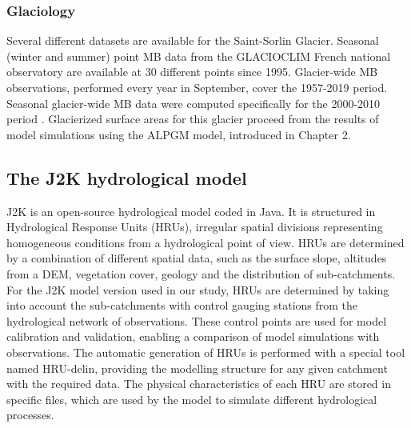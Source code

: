 \subsubsection{Glaciology}

Several different datasets are available for the Saint-Sorlin Glacier. Seasonal (winter and summer) point MB data from the GLACIOCLIM French national observatory are available at 30 different points since 1995. Glacier-wide MB observations, performed every year in September, cover the 1957-2019 period. Seasonal glacier-wide MB data were computed specifically for the 2000-2010 period \citep{davaze_monitoring_2018}. Glacierized surface areas for this glacier proceed from the results of model simulations using the ALPGM model, introduced in Chapter 2. 

\subsection{The J2K hydrological model}

J2K is an open-source hydrological model coded in Java. It is structured in Hydrological Response Units (HRUs), irregular spatial divisions representing homogeneous conditions from a hydrological point of view. HRUs are determined by a combination of different spatial data, such as the surface slope, altitudes from a DEM, vegetation cover, geology and the distribution of sub-catchments. For the J2K model version used in our study, HRUs are determined by taking into account the sub-catchments with control gauging stations from the hydrological network of observations. These control points are used for model calibration and validation, enabling a comparison of model simulations with observations. The automatic generation of HRUs is performed with a special tool named HRU-delin, providing the modelling structure for any given catchment with the required data. The physical characteristics of each HRU are stored in specific files, which are used by the model to simulate different hydrological processes. 

